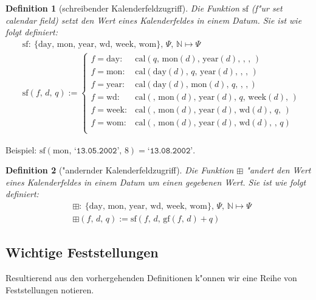 \documentclass[a4paper]{article}
\newcommand*{\dayf}{\mathrm{day}}
\newcommand*{\monf}{\mathrm{mon}}
\newcommand*{\yearf}{\mathrm{year}}
\newcommand*{\wdf}{\mathrm{wd}}
\newcommand*{\weekf}{\mathrm{week}}
\newcommand*{\womf}{\mathrm{wom}}
\newcommand*{\calf}{\mathrm{cal}}
\newcommand*{\datev}[1]{\texttt{`#1'}}
\newcommand*{\gff}{\mathrm{gf}}
\newcommand*{\sff}{\mathrm{sf}}
\newcommand*{\addff}{\boxplus}
\numberwithin{equation}{section}
\newtheorem{dfn}{Definition}
\begin{document}
\begin{dfn}[schreibender Kalenderfeldzugriff]
  Die Funktion $\sff$ (f"ur \emph{set calendar field}) setzt den Wert eines
  Kalenderfeldes in einem Datum. Sie ist wie folgt definiert:
  \begin{equation}
  \begin{split}
    & \sff :\ \{\dayf,\,\monf,\,\yearf,\,\wdf,\,\weekf,\,\womf\},\,\Psi,\,
      \mathbb{N} \mapsto \Psi \\
    & \sff(f,\,d,\,q) := \left\{\begin{array}{ll}
        f = \dayf : & \calf(q,\,\monf(d),\,\yearf(d),\,,\,,\,) \\
        f = \monf : & \calf(\dayf(d),\,q,\,\yearf(d),\,,\,,\,) \\
        f = \yearf : & \calf(\dayf(d),\,\monf(d),\,q,\,,\,,) \\
        f = \wdf : & \calf(,\,\monf(d),\,\yearf(d),\,q,\,\weekf(d),\,) \\
        f = \weekf : & \calf(,\,\monf(d),\,\yearf(d),\,\wdf(d),\,q,\,) \\
        f = \womf : & \calf(,\,\monf(d),\,\yearf(d),\,\wdf(d),\,,\,q) \\
      \end{array}\right.
  \end{split}
  \end{equation}
\end{dfn}
\noindent Beispiel: $\sff(\monf,\,\datev{13.05.2002},\,8) = \datev{13.08.2002}$.

\begin{dfn}["andernder Kalenderfeldzugriff]
  Die Funktion $\addff$ "andert den Wert eines Kalenderfeldes in einem Datum um
  einen gegebenen Wert. Sie ist wie folgt definiert:
  \begin{equation}
  \begin{split}
    & \addff :\ \{\dayf,\,\monf,\,\yearf,\,\wdf,\,\weekf,\,\womf\},\,\Psi,\,
      \mathbb{N} \mapsto \Psi \\
    & \addff(f,\,d,\,q) := \sff(f,\,d,\,\gff(f,\,d) + q)
  \end{split}
  \end{equation}
\end{dfn}


%
%
\subsection{Wichtige Feststellungen}
Resultierend aus den vorhergehenden Definitionen k"onnen wir eine Reihe von
Feststellungen notieren.
\end{document}

